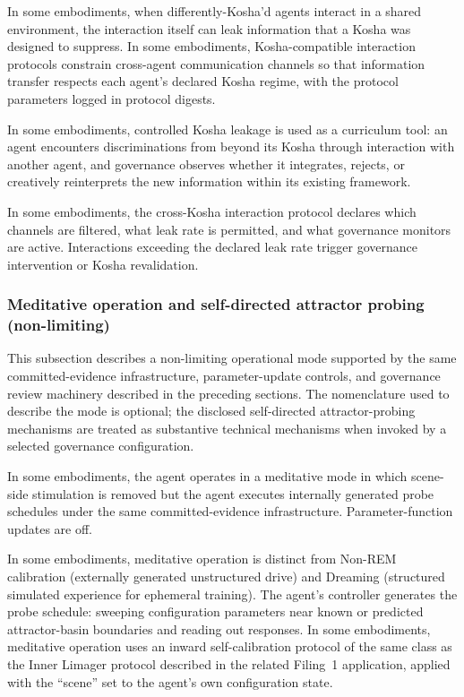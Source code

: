\documentclass[a4paper,12pt]{article}
\newcommand{\LI}{Limager\xspace}
\begin{document}

In some embodiments, when differently-Kosha'd agents interact in a
shared environment, the interaction itself can leak information that
a Kosha was designed to suppress. In some embodiments,
Kosha-compatible interaction protocols constrain cross-agent
communication channels so that information transfer respects each
agent's declared Kosha regime, with the protocol parameters logged in
protocol digests.

In some embodiments, controlled Kosha leakage is used as a curriculum
tool: an agent encounters discriminations from beyond its Kosha
through interaction with another agent, and governance observes
whether it integrates, rejects, or creatively reinterprets the new
information within its existing framework.

In some embodiments, the cross-Kosha interaction protocol declares
which channels are filtered, what leak rate is permitted, and what
governance monitors are active. Interactions exceeding the declared
leak rate trigger governance intervention or Kosha revalidation.

\subsubsection{Meditative operation and self-directed attractor probing
  (non-limiting)}


This subsection describes a non-limiting operational mode supported by
the same committed-evidence infrastructure, parameter-update controls,
and governance review machinery described in the preceding sections.
The nomenclature used to describe the mode is optional; the disclosed
self-directed attractor-probing mechanisms are treated as substantive
technical mechanisms when invoked by a selected governance
configuration.

In some embodiments, the agent operates in a meditative mode in which
scene-side stimulation is removed but the agent executes internally
generated probe schedules under the same committed-evidence
infrastructure. Parameter-function updates are off.

In some embodiments, meditative operation is distinct from Non-REM
calibration (externally generated unstructured drive) and Dreaming
(structured simulated experience for ephemeral training). The agent's controller
generates the probe schedule: sweeping configuration parameters near
known or predicted attractor-basin boundaries and reading out
responses. In some embodiments, meditative operation uses an inward
self-calibration protocol of the same class as the Inner \LI
protocol described in the related Filing~1 application,
applied with the ``scene'' set to the agent's own configuration
state.
\end{document}

